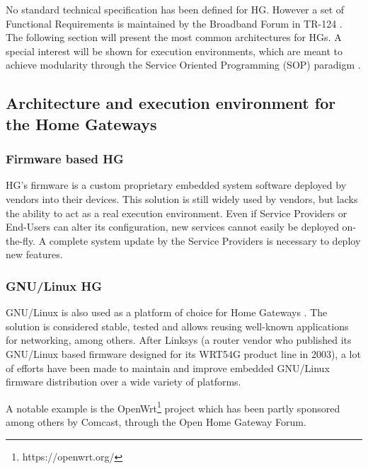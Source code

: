  
No standard technical specification has been defined for HG. However a set of Functional Requirements is maintained by the Broadband Forum in TR-124 \cite{broadband_forum_functional_2014}.
The following section will present the most common architectures for HGs.
A special interest will be shown for execution environments, which are meant to achieve modularity through the Service Oriented Programming (SOP) paradigm \cite{bieber2001introduction}.


\subsection{Architecture and execution environment for the Home Gateways}

\subsubsection{Firmware based HG}
HG's firmware is a custom proprietary embedded system software deployed by vendors into their devices.
This solution is still widely used by vendors, but lacks the ability to act as a real execution environment.
Even if Service Providers or End-Users can alter its configuration, new services cannot easily be deployed on-the-fly.
A complete system update by the Service Providers is necessary to deploy new features.
   
\subsubsection{GNU/Linux HG}
   
GNU/Linux is also used as a platform of choice for Home Gateways \cite{royon_multiservice_2007}.
The solution is considered stable, tested and allows reusing well-known applications for networking, among others.
After Linksys (a router vendor who published its GNU/Linux based firmware designed for its WRT54G product line in 2003), a lot of efforts have been made to maintain and improve embedded GNU/Linux firmware distribution over a wide variety of platforms.

A notable example is the OpenWrt\footnote{https://openwrt.org/} project which has been partly sponsored among others by Comcast, through the Open Home Gateway Forum.


